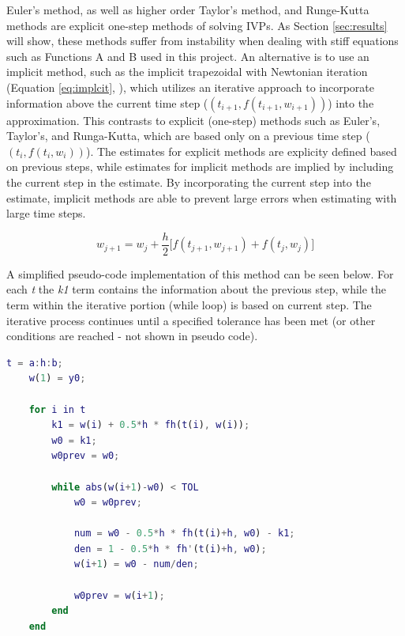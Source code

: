 \documentclass{article}
\begin{document}
Euler's method, as well as higher order Taylor's method, and Runge-Kutta methods are explicit one-step methods of solving IVPs. As Section \ref{sec:results} will show, these methods suffer from instability when dealing with stiff equations such as Functions A and B used in this project. An alternative is to use an implicit method, such as the implicit trapezoidal with Newtonian iteration (Equation \ref{eq:implcit}, \citep{burden2010}), which utilizes an iterative approach to incorporate information above the current time step ($(t_{i+1}, f(t_{i+1}, w_{i+1}))$) into the approximation. This contrasts to explicit (one-step) methods such as Euler's, Taylor's, and Runga-Kutta, which are based only on a previous time step ($(t_{i}, f(t_{i}, w_{i}))$). The estimates for explicit methods are explicity defined based on previous steps, while estimates for implicit methods are implied by including the current step in the estimate. By incorporating the current step into the estimate, implicit methods are able to prevent large errors when estimating with large time steps.

\begin{center}
	\begin{equation}
	w_{j+1} = w_j + \frac{h}{2} \big[ f(t_{j+1}, w_{j+1}) + f(t_{j}, w_{j}) \big]
	\label{eq:implcit}
	\end{equation}
\end{center}

A simplified pseudo-code implementation of this method can be seen below. For each \textit{t} the \textit{k1} term contains the information about the previous step, while the term within the iterative portion (while loop) is based on current step. The iterative process continues until a specified tolerance has been met (or other conditions are reached - not shown in pseudo code).

\bigskip
\begin{center}
\footnotesize
\begin{lstlisting}[language=Matlab]
    t = a:h:b;
    w(1) = y0;

    for i in t
        k1 = w(i) + 0.5*h * fh(t(i), w(i));
        w0 = k1;
        w0prev = w0;

        while abs(w(i+1)-w0) < TOL
            w0 = w0prev;

            num = w0 - 0.5*h * fh(t(i)+h, w0) - k1;
            den = 1 - 0.5*h * fh'(t(i)+h, w0);
            w(i+1) = w0 - num/den;

            w0prev = w(i+1);
        end    
    end
\end{lstlisting}
\end{center}
\bigskip
\end{document}
